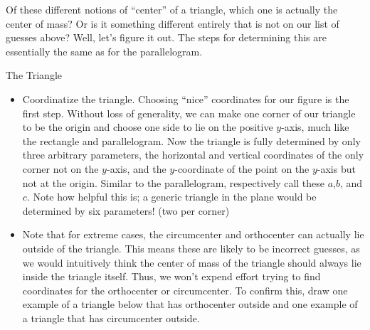 Of these different notions of ``center'' of a triangle, which one is actually the center of mass?  Or is it something different entirely that is not on our list of guesses above?  Well, let's figure it out.  The steps for determining this are essentially the same as for the parallelogram.
\begin{exercise}{The Triangle \Coffeecup \Coffeecup \Coffeecup}

\begin{itemize}

\item Coordinatize the triangle.  Choosing ``nice'' coordinates for our figure is the first step.  Without loss of generality, we can make one corner of our triangle to be the origin and choose one side to lie on the positive $y$-axis, much like the rectangle and parallelogram.  Now the triangle is fully determined by only three arbitrary parameters, the horizontal and vertical coordinates of the only corner not on the $y$-axis, and the $y$-coordinate of the point on the $y$-axis but not at the origin.  Similar to the parallelogram, respectively call these $a$,$b$, and $c$.  Note how helpful this is; a generic triangle in the plane would be determined by six parameters! (two per corner)


\item Note that for extreme cases, the circumcenter and orthocenter can actually lie outside of the triangle.  This means these are likely to be incorrect guesses, as we would intuitively think the center of mass of the triangle should always lie inside the triangle itself.  Thus, we won't expend effort trying to find coordinates for the orthocenter or circumcenter.  To confirm this, draw one example of a triangle below that has orthocenter outside and one example of a triangle that has circumcenter outside.


\end{itemize}
\end{exercise}
